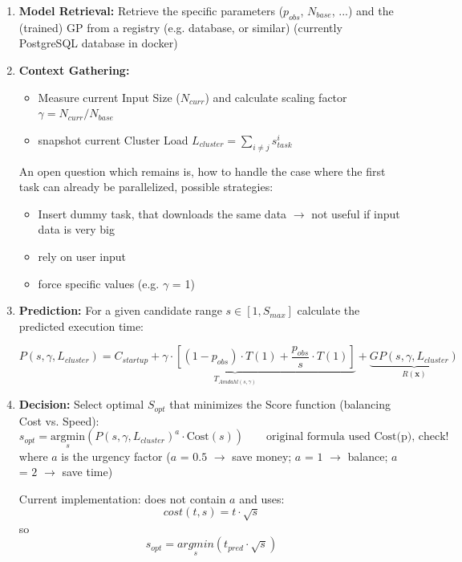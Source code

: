 \documentclass[a4paper, 12pt]{article}
\begin{document}
	\begin{enumerate}
		\item \textbf{Model Retrieval:} Retrieve the specific parameters ($p_{obs}$, $N_{base}$, ...) and the (trained) GP from a registry (e.g. database, or similar) (currently PostgreSQL database in docker)
		
		\item \textbf{Context Gathering:} 
		\begin{itemize}
			\item Measure current Input Size ($N_{curr}$) and calculate scaling factor $\gamma = N_{curr} / N_{base}$
			\item snapshot current Cluster Load $L_{cluster} = \sum_{i \neq j} s_{task}^i$
		\end{itemize}
		An open question which remains is, how to handle the case where the first task can already be parallelized, possible strategies:
		\begin{itemize}
			\item Insert dummy task, that downloads the same data $\to$ not useful if input data is very big
			\item rely on user input
			\item force specific values (e.g. $\gamma$ = 1)
		\end{itemize}
		
		\item \textbf{Prediction:} For a given candidate range $s \in [1, S_{max}]$ calculate the predicted execution time:
		
		\[
		P(s, \gamma, L_{cluster}) = \underbrace{C_{startup} + \gamma \cdot \left[ (1 - p_{obs}) \cdot T(1) + \frac{p_{obs}}{s} \cdot T(1) \right]}_{T_{Amdahl(s, \gamma)}} + \underbrace{GP(s, \gamma, L_{cluster})}_{R(\mathbf{x})}
		\]
		\item \textbf{Decision:} Select optimal $S_{opt}$ that minimizes the Score function (balancing Cost vs. Speed):
		\[
		s_{opt} = \underset{s}{\mathrm{argmin}} \left( P(s, \gamma, L_{cluster})^a \cdot \text{Cost}(s) \right) \qquad \text{original formula used Cost(p), check!}
		\]
		where $a$ is the urgency factor ($a$ = $0.5$ $\to$ save money; $a$ = $1$ $\to$ balance; $a$ = $2$ $\to$ save time)
		
		Current implementation: does not contain $a$ and uses:
		\[
		cost(t, s) = t \cdot \sqrt{s}
		\]
		so
		\[
		s_{opt} = \underset{s}{argmin}\left( t_{pred} \cdot \sqrt{s}\right)
		\]
		

\end{enumerate}
\end{document}
